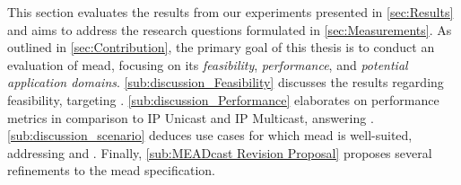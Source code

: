 This section evaluates the results from our experiments presented in
    \autoref{sec:Results} and aims to address the research questions
    formulated in \autoref{sec:Measurements}.
As outlined in \autoref{sec:Contribution}, the primary goal of this thesis is
    to conduct an evaluation of \gls{mead}, focusing on its 
    \textit{feasibility}, \textit{performance}, and \textit{potential
    application domains}.
\autoref{sub:discussion_Feasibility} discusses the results regarding
    feasibility, targeting \rqi{}.
\autoref{sub:discussion_Performance} elaborates on performance metrics
    in comparison to IP Unicast and IP Multicast, answering \rqii{}.
\autoref{sub:discussion_scenario} deduces use cases for which \gls{mead} is
    well-suited, addressing \rqiii{} and \rqiv{}.
Finally, \autoref{sub:MEADcast Revision Proposal} proposes several refinements
    to the \gls{mead} specification.

